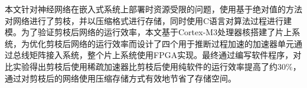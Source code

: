 本文针对神经网络在嵌入式系统上部署时资源受限的问题，使用基于绝对值的方法对网络进行了剪枝，并以压缩格式进行存储，同时使用C语言对算法过程进行建模。为了验证剪枝后网络的运行效率，本文基于Cortex-M3处理器核搭建了片上系统，为优化剪枝后网络的运行效率而设计了四个用于推断过程加速的加速器单元通过总线矩阵接入系统，整个片上系统使用FPGA实现。最终通过编写软件程序，对比实验得出剪枝后使用稀疏加速器比剪枝后使用纯软件的运行效率提高了约30\%，通过对剪枝后的网络使用压缩存储方式有效地节省了存储空间。